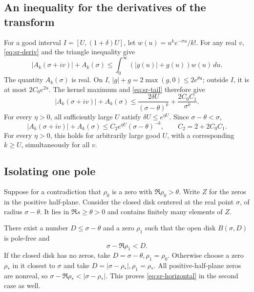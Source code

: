 \subsection{An inequality for the derivatives of the transform}
For a good interval \(I=[U,(1+\delta)U]\), let
\(w(u)=u^k e^{-\sigma u}/k!\).
For any real \(v\), \eqref{eq:sr-deriv} and the triangle inequality give
\[
 |A_k(\sigma+iv)|+A_k(\sigma)
 \leq\int_0^\infty(|g(u)|+g(u))w(u)\,du .
\]
The quantity \(A_k(\sigma)\) is real. On \(I\),
\(|g|+g=2\max(g,0)\leq2e^{\theta u}\); outside \(I\), it is at most
\(2C_0e^{2u}\). The kernel maximum and \eqref{eq:sr-tail} therefore give
\begin{equation}\label{eq:sr-key}
 |A_k(\sigma+iv)|+A_k(\sigma)
 \leq\frac{2\delta U}{(\sigma-\theta)^k}
       +\frac{2C_0C_1}{\sigma^k}.
\end{equation}
For every \(\eta>0\), all sufficiently large \(U\) satisfy
\(\delta U\leq e^{\eta U}\). Since \(\sigma-\theta<\sigma\),
\begin{equation}\label{eq:sr-key2}
 |A_k(\sigma+iv)|+A_k(\sigma)
 \leq C_2 e^{\eta U}(\sigma-\theta)^{-k},
 \qquad C_2=2+2C_0C_1.
\end{equation}
For every \(\eta>0\), this holds for arbitrarily large good \(U\),
with a corresponding \(k\geq U\), simultaneously for all \(v\).

\subsection{Isolating one pole}
Suppose for a contradiction that \(\rho_0\) is a zero with
\(\Re\rho_0>\theta\). Write \(Z\) for the zeros in the positive half-plane.
Consider the closed disk centered at the real point \(\sigma\), of radius
\(\sigma-\theta\). It lies in \(\Re s\geq\theta>0\) and contains finitely
many elements of \(Z\).

There exist a number \(D\leq\sigma-\theta\) and a zero \(\rho_1\) such that
the open disk \(B(\sigma,D)\) is pole-free and
\begin{equation}\label{eq:sr-horizontal}
 \sigma-\Re\rho_1<D.
\end{equation}
If the closed disk has no zeros, take \(D=\sigma-\theta,\rho_1=\rho_0\).
Otherwise choose a zero \(\rho_*\) in it closest to \(\sigma\) and take
\(D=|\sigma-\rho_*|,\rho_1=\rho_*\).
All positive-half-plane zeros are nonreal, so
\(\sigma-\Re\rho_*<|\sigma-\rho_*|\).
This proves \eqref{eq:sr-horizontal} in the second case as well.

